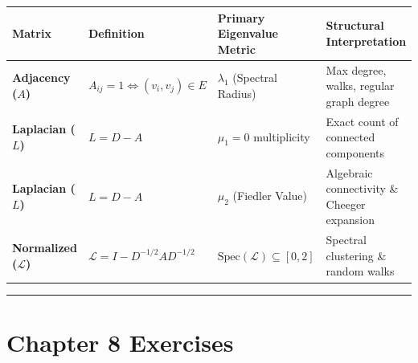 \documentclass[
]{book}
\newcounter{none} %
\theoremstyle{definition}
\theoremstyle{definition}
\theoremstyle{definition}
\theoremstyle{definition}
\theoremstyle{remark}
\begin{document}
{\def\LTcaptype{none} %
\begin{longtable}[]{@{}
  >{\raggedright\arraybackslash}p{}
  >{\raggedright\arraybackslash}p{}
  >{\raggedright\arraybackslash}p{}
  >{\raggedright\arraybackslash}p{}@{}}
\toprule\noalign{}
\begin{minipage}[b]{\linewidth}\raggedright
Matrix
\end{minipage} & \begin{minipage}[b]{\linewidth}\raggedright
Definition
\end{minipage} & \begin{minipage}[b]{\linewidth}\raggedright
Primary Eigenvalue Metric
\end{minipage} & \begin{minipage}[b]{\linewidth}\raggedright
Structural Interpretation
\end{minipage} \\
\midrule\noalign{}
\endhead
\bottomrule\noalign{}
\endlastfoot
\textbf{Adjacency (\(A\))} & \(A_{ij} = 1 \iff (v_i, v_j) \in E\) & \(\lambda_1\) (Spectral Radius) & Max degree, walks, regular graph degree \\
\textbf{Laplacian (\(L\))} & \(L = D - A\) & \(\mu_1 = 0\) multiplicity & Exact count of connected components \\
\textbf{Laplacian (\(L\))} & \(L = D - A\) & \(\mu_2\) (Fiedler Value) & Algebraic connectivity \& Cheeger expansion \\
\textbf{Normalized (\(\mathcal{L}\))} & \(\mathcal{L} = I - D^{-1/2} A D^{-1/2}\) & \(\text{Spec}(\mathcal{L}) \subseteq [0, 2]\) & Spectral clustering \& random walks \\
\end{longtable}
}

\begin{center}\rule{0.5\linewidth}{0.5pt}\end{center}

\section{Chapter 8 Exercises}\label{chapter-8-exercises}
\end{document}
